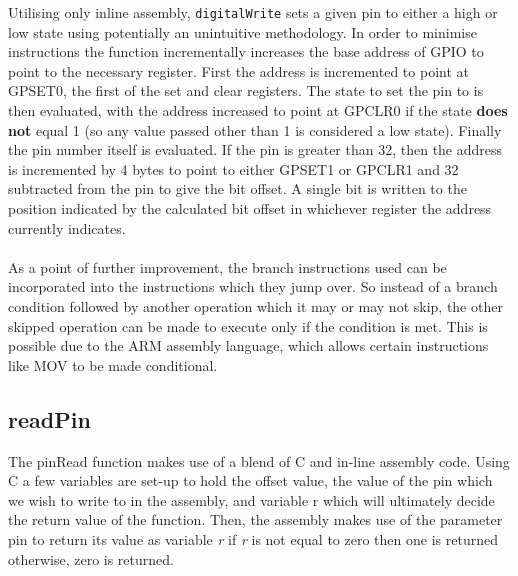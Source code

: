 \documentclass[a4paper, titlepage]{article}
\begin{document}
Utilising only inline assembly, \texttt{digitalWrite} sets a given pin to either a high or low state using potentially an unintuitive methodology. In order to minimise instructions the function incrementally increases the base address of GPIO to point to the necessary register. First the address is incremented to point at GPSET0, the first of the set and clear registers. The state to set the pin to is then evaluated, with the address increased to point at GPCLR0 if the state \textbf{does not} equal 1 (so any value passed other than 1 is considered a low state). Finally the pin number itself is evaluated. If the pin is greater than 32, then the address is incremented by 4 bytes to point to either GPSET1 or GPCLR1 and 32 subtracted from the pin to give the bit offset. A single bit is written to the position indicated by the calculated bit offset in whichever register the address currently indicates.
\\ \\
As a point of further improvement, the branch instructions used can be incorporated into the instructions which they jump over. So instead of a branch condition followed by another operation which it may or may not skip, the other skipped operation can be made to execute only if the condition is met. This is possible due to the ARM assembly language, which allows certain instructions like MOV to be made conditional.


\subsection{readPin}
The pinRead function makes use of a blend of C and in-line assembly code. Using C a few variables are set-up to hold the offset  value, the value of the pin which we wish to write to in the assembly, and variable r which will ultimately decide the return value of the function. Then, the assembly makes use of the parameter pin to return its value as variable \textit{r} if \textit{r} is not equal to zero then one is returned otherwise, zero is returned. 
\end{document}
